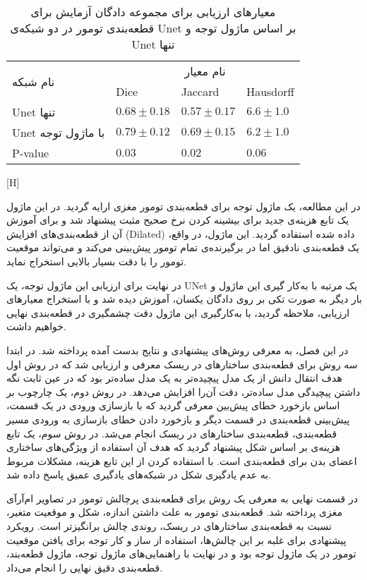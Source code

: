 \begin{table}[H]
	\caption{معیارهای ارزیابی برای مجموعه دادگان آزمایش برای قطعه‌بندی تومور در دو شبکه‌ی Unet بر اساس ماژول توجه و Unet تنها}
	\label{attable}
	\begin{tabular}{llll}
		\hline
		\multirow{2}{*}{نام شبکه} & \multicolumn{3}{c}{نام معیار}                     \\ \cline{2-4} 
		& Dice  & Jaccard  & Hausdorff    \\ \hline
		Unet تنها     & $0.68 \pm 0.18$ & $0.57 \pm 0.17$   & $6.6 \pm 1.0 $           \\ \hline
		Unet با ماژول توجه      & $0.79 \pm 0.12$ & $0.69 \pm 0.15$   & $6.2 \pm 1.0$            \\ \hline
		P-value                      & $0.03 $       & $0.02 $         & $0.06$                 \\ \hline
	\end{tabular}
\end{table}


[H]


در این مطالعه، یک ماژول توجه برای قطعه‌بندی تومور مغزی ارایه گردید. در این ماژول یک تابع هزینه‌ی جدید برای بیشینه کردن نرخ صحیح مثبت پیشنهاد شد و برای آموزش آن از قطعه‌بندی‌های افزایش (Dilated) داده شده استفاده گردید. این ماژول، در واقع، یک قطعه‌بندی نادقیق اما در برگیرنده‌ی تمام تومور پیش‌بینی می‌کند و می‌تواند موقعیت تومور را با دقت بسیار بالایی استخراج نماید. 

در نهایت برای ارزیابی این ماژول توجه، یک UNet یک مرتبه با به‌کار گیری این ماژول و بار دیگر به صورت تکی بر روی دادگان یکسان، آموزش دیده شد و با استخراج معیارهای ارزیابی، ملاحظه گردید، با به‌کارگیری این ماژول دقت چشمگیری در قطعه‌بندی نهایی خواهیم داشت.


در این فصل، به معرفی روش‌های پیشنهادی و نتایج بدست آمده پرداخته شد. در ابتدا سه روش برای قطعه‌بندی ساختارهای در ریسک معرفی و ارزیابی شد که در روش اول هدف انتقال دانش از یک مدل پیچیده‌تر به یک مدل ساده‌تر بود که در عین ثابت نگه داشتن پیچیدگی مدل ساده‌تر، دقت آن‌را افزایش می‌دهد. در روش دوم، یک چارچوب بر اساس بازخورد خطای پیش‌بین معرفی گردید که با بازسازی ورودی در یک قسمت، پیش‌بینی قطعه‌بندی در قسمت دیگر و بازخورد دادن خطای بازسازی به ورودی مسیر قطعه‌بندی، قطعه‌بندی ساختارهای در ریسک انجام می‌شد. در روش سوم، یک تابع هزینه‌ی بر اساس شکل پیشنهاد گردید که هدف آن استفاده از ویژگی‌های ساختاری اعضای بدن برای قطعه‌بندی است. با استفاده کردن از این تابع هزینه، مشکلات مربوط به عدم یادگیری شکل در شبکه‌های یادگیری عمیق پاسخ داده شد.

در قسمت نهایی به معرفی یک روش برای قطعه‌بندی پرچالش تومور در تصاویر ام‌آرآی مغزی پرداخته شد. قطعه‌بندی تومور به علت داشتن اندازه، شکل و موقعیت متغیر، نسبت به قطعه‌بندی ساختارهای در ریسک، روندی چالش برانگیزتر است. رویکرد پیشنهادی برای غلبه بر این چالش‌ها، استفاده از ساز و کار توجه برای یافتن موقعیت تومور در یک ماژول توجه بود و در نهایت با راهنمایی‌های ماژول توجه، ماژول قطعه‌بند، قطعه‌بندی دقیق نهایی را انجام می‌داد. 


